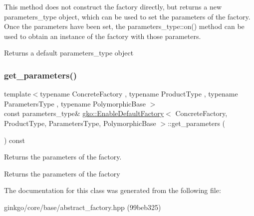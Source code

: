 This method does not construct the factory directly, but returns a new parameters\+\_\+type object, which can be used to set the parameters of the factory. Once the parameters have been set, the parameters\+\_\+type\+::on() method can be used to obtain an instance of the factory with those parameters.

\begin{DoxyReturn}{Returns}
a default parameters\+\_\+type object 
\end{DoxyReturn}
\mbox{\label{classgko_1_1EnableDefaultFactory_ae32f2b3100640293f3a46e1280965162}} 
\subsubsection{\texorpdfstring{get\+\_\+parameters()}{get\_parameters()}}
{\footnotesize\ttfamily template$<$typename Concrete\+Factory , typename Product\+Type , typename Parameters\+Type , typename Polymorphic\+Base $>$ \\
const parameters\+\_\+type\& \hyperlink{classgko_1_1EnableDefaultFactory}{gko\+::\+Enable\+Default\+Factory}$<$ Concrete\+Factory, Product\+Type, Parameters\+Type, Polymorphic\+Base $>$\+::get\+\_\+parameters (\begin{DoxyParamCaption}{ }\end{DoxyParamCaption}) const\hspace{0.3cm}{\ttfamily [noexcept]}}



Returns the parameters of the factory. 

\begin{DoxyReturn}{Returns}
the parameters of the factory 
\end{DoxyReturn}


The documentation for this class was generated from the following file\+:\begin{DoxyCompactItemize}
\item 
ginkgo/core/base/abstract\+\_\+factory.\+hpp (99beb325)\end{DoxyCompactItemize}
